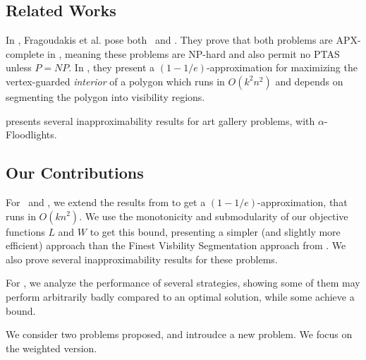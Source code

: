 \subsection{Related Works}
In \cite{fragoudakis-interior,fragoudakis-boundary,fragoudakis-paintings}, Fragoudakis et al. pose both \MLVG\ and \MVVG. They prove that both problems are APX-complete in \cite{fragoudakis-boundary}, meaning these problems are NP-hard and also permit no PTAS unless $P=NP$. In \cite{fragoudakis-interior}, they present a $(1-1/e)$-approximation for maximizing the vertex-guarded \emph{interior} of a polygon which runs in $O(k^2n^2)$ and depends on segmenting the polygon into visibility regions.

\cite{abdelkader} presents several inapproximability results for art gallery problems, with $\alpha$-Floodlights.


\cite{bukov}

\subsection{Our Contributions}
For \MLVG\ and \MVVG, we extend the results from \cite{fragoudakis-interior} to get a $(1-1/e)$-approximation, that runs in $O(kn^2)$. We use the monotonicity and submodularity of our objective functions $L$ and $W$ to get this bound, presenting a simpler (and slightly more efficient) approach than the Finest Visbility Segmentation approach from \cite{fragoudakis-interior,fragoudakis-paintings}. We also prove several inapproximability results for these problems.

For \DMVVG, we analyze the performance of several strategies, showing some of them may perform arbitrarily badly compared to an optimal solution, while some achieve a bound. 





We consider two problems proposed, and introudce a new problem. We focus on the weighted version.




